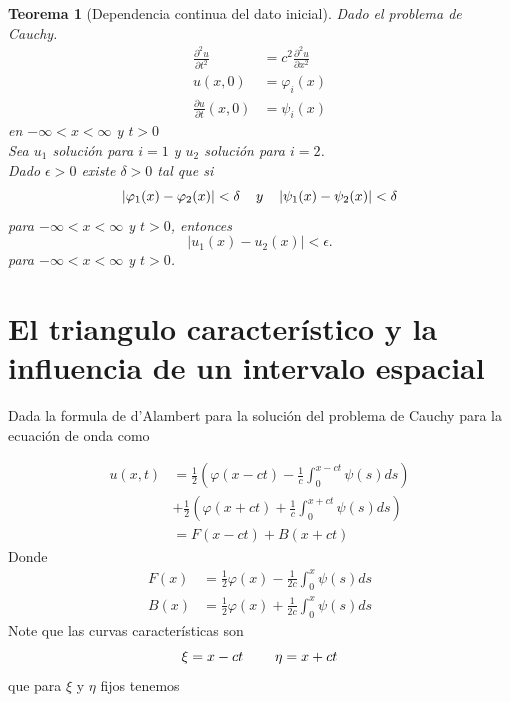 \documentclass[11pt]{book}
\theoremstyle{plain}
\newtheorem{teo}[proposición]{Teorema}
\theoremstyle{definition}
\begin{document}
\begin{teo}[Dependencia continua del dato inicial]
    Dado el problema de Cauchy.
    \begin{align*}
    \frac{\partial^2 u}{\partial t^2} &= c^2 \frac{\partial^2 u}{\partial x^2}\\
    u(x,0)&= \varphi_i(x)\\
    \frac{\partial u}{\partial t}(x,0) &= \psi_i(x)
    \end{align*}
    en $-\infty < x < \infty$ y $t > 0$\\
    Sea $u_1$ solución para $i=1$ y $u_2$ solución para $i=2$.\\
    Dado $\epsilon > 0$ existe $\delta > 0$ tal que si
    \begin{equation*}
        |\varphi_1(x)-\varphi_2(x)|<\delta \hspace{4mm}y\hspace{4mm } |\psi_1(x)-\psi_2(x)|<\delta
    \end{equation*}
    para $-\infty < x < \infty$ y $t > 0$, entonces 
    \[|u_1(x)-u_2(x)|<\epsilon.\]
    para $-\infty < x < \infty$ y $t > 0$.\\
\end{teo}

\section{El triangulo característico y la influencia de un intervalo espacial}
Dada la formula de d'Alambert para la solución del problema de Cauchy para la ecuación de onda como

\setcounter{equation}{0}
\begin{align}
    u(x,t) & = \frac{1}{2}\left( \varphi(x - ct) - \frac{1}{c}\int_{0}^{x-ct}\psi(s)ds\right)\\
    &+ \frac{1}{2}\left(\varphi(x + ct) + \frac{1}{c}\int_{0}^{x+ct}\psi(s)ds \right)\\
    &=F(x-ct) + B(x+ct)
\end{align}
Donde 
\begin{align}
    F(x) &= \frac{1}{2} \varphi(x) - \frac{1}{2c}\int_{0}^{x}\psi(s)ds\\
    B(x) &=  \frac{1}{2} \varphi(x) + \frac{1}{2c}\int_{0}^{x}\psi(s)ds
\end{align}
Note que las curvas características son
\begin{equation*}
    \xi = x-ct \hspace{8mm} \eta = x+ct
\end{equation*}
que para $\xi$ y $\eta$ fijos tenemos 
\end{document}
